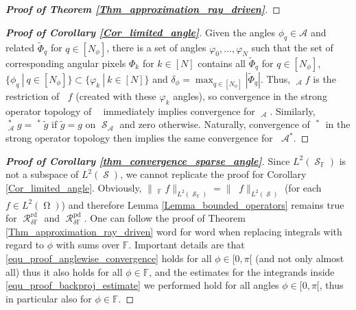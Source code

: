 \documentclass[11pt,reqno]{amsart}
\DeclareMathOperator{\Radon}{\mathcal{R}}
\DeclareMathOperator{\GenRadon}{\mathcal{R}^\omega_{\delta}}
\DeclareMathOperator{\imgdom}{\Omega}
\DeclareMathOperator{\sinodom}{\mathcal{S}}
\numberwithin{theorem}{section}
\theoremstyle{remark}
\begin{document}
\begin{proof}[\textbf{Proof of Theorem \ref{Thm_approximation_ray_driven}}]
\end{proof}



\begin{proof}[\textbf{Proof of Corollary \ref{Cor_limited_angle}}]
Given the angles $\phi_q \in \mathcal{A}$ and related $\widetilde \Phi_q$ for $q\in[N_\phi]$, there is a set of angles $\varphi_0,\dots,\varphi_N$ such that the set of corresponding angular pixels $\Phi_k$ for $k\in[N]$ contains all $\widetilde \Phi_q$ for $q\in [N_\phi]$, $\{\phi_q \ | \ q \in [N_\phi]\}\subset \{\varphi_k \ | \ k \in [N]\}$ and $\delta_\phi=\max_{q\in[N_\phi]} |\widetilde \Phi_q|$. Thus, $\GenRadon_{\mathcal{A}}f$ is the restriction of $\GenRadon f$ (created with these $\varphi_k$ angles), so convergence in the strong operator topology of $\GenRadon$ immediately implies convergence for $\GenRadon_{\mathcal{A}}$. Similarly, $\GenRadon_{\mathcal{A}}^* g=\GenRadon^* \tilde g$ if $\tilde g = g $ on $\sinodom_\mathcal{A}$ and zero otherwise. Naturally, convergence of $\GenRadon^* $ in the strong operator topology then implies the same convergence for $\GenRadon{\mathcal{A}}^* $.
\end{proof}


\begin{proof}[\textbf{Proof of Corollary \ref{thm_convergence_sparse_angle}}]
Since $L^2(\sinodom_\mathbb{F})$ is not a subspace of $L^2(\sinodom)$, we cannot replicate the proof for Corollary \ref{Cor_limited_angle}.
Obviously, $\|\GenRadon_{\mathbb{F}} f\|_{L^2(\sinodom_\mathbb{F})}=\|\GenRadon f\|_{L^2(\sinodom)}$ (for each $f\in L^2(\imgdom)$) and therefore Lemma \ref{Lemma_bounded_operators} remains true for $\Radon_{\delta \mathbb{F}}^\mathrm{rd}$ and $\Radon_{\delta \mathbb{F}}^\mathrm{pd}$. One can follow the proof of Theorem \ref{Thm_approximation_ray_driven} word for word when replacing integrals with regard to $\phi$ with sums over $\mathbb{F}$. Important details are that \eqref{equ_proof_anglewise_convergence} holds for all $\phi \in [0,\pi[$ (and not only almost all) thus it also holds for all $\phi\in \mathbb{F}$, and the estimates for the integrands inside \eqref{equ_proof_backproj_estimate} we performed hold for all angles $\phi \in [0,\pi[$, thus in particular also for $\phi \in \mathbb{F}$.
\end{proof}
\end{document}
